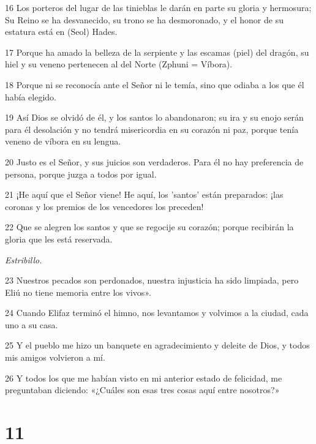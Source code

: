 \par 16 Los porteros del lugar de las tinieblas le darán en parte su gloria y hermosura; Su Reino se ha desvanecido, su trono se ha desmoronado, y el honor de su estatura está en (Seol) Hades.

\par 17 Porque ha amado la belleza de la serpiente y las escamas (piel) del dragón, su hiel y su veneno pertenecen al del Norte (Zphuni = Víbora).

\par 18 Porque ni se reconocía ante el Señor ni le temía, sino que odiaba a los que él había elegido.

\par 19 Así Dios se olvidó de él, y los santos lo abandonaron; su ira y su enojo serán para él desolación y no tendrá misericordia en su corazón ni paz, porque tenía veneno de víbora en su lengua.

\par 20 Justo es el Señor, y sus juicios son verdaderos. Para él no hay preferencia de persona, porque juzga a todos por igual.

\par 21 ¡He aquí que el Señor viene! He aquí, los 'santos' están preparados: ¡las coronas y los premios de los vencedores los preceden!

\par 22 Que se alegren los santos y que se regocije su corazón; porque recibirán la gloria que les está reservada.

\par \textit{Estribillo.}

\par 23 Nuestros pecados son perdonados, nuestra injusticia ha sido limpiada, pero Eliú no tiene memoria entre los vivos».

\par 24 Cuando Elifaz terminó el himno, nos levantamos y volvimos a la ciudad, cada uno a su casa.

\par 25 Y el pueblo me hizo un banquete en agradecimiento y deleite de Dios, y todos mis amigos volvieron a mí.

\par 26 Y todos los que me habían visto en mi anterior estado de felicidad, me preguntaban diciendo: «¿Cuáles son esas tres cosas aquí entre nosotros?»

\chapter{11}

